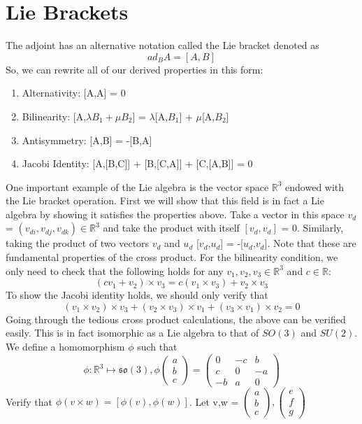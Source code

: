 \documentclass{article}
\begin{document}
\section{Lie Brackets}
The adjoint has an alternative notation called the Lie bracket denoted as
\[ad_{B}A = [A,B]\]
So, we can rewrite all of our derived properties in this form:
\begin{enumerate}
    \item Alternativity: [A,A] = 0
    \item Bilinearity: [A,$\lambda B_{1}+\mu B_{2}$] = $\lambda$[A,$B_{1}$] + $\mu$[A,$B_{2}$]
    \item Antisymmetry: [A,B] = -[B,A]
    \item Jacobi Identity: [A,[B,C]] + [B,[C,A]] + [C,[A,B]] = 0
\end{enumerate}
One important example of the Lie algebra is the vector space $\mathbb{R}^3$ endowed with the Lie bracket operation. First we will show that this field is in fact a Lie algebra by showing it satisfies the properties above.
Take a vector in this space $v_{d}$ = $(v_{di},v_{dj},v_{dk}) \in \mathbb{R}^3$ and take the product with itself $[v_{d},v_{d}]$ = 0. Similarly, taking the product of two vectors $v_{d}$ and $u_{d}$ [$v_{d}$,$u_{d}$] = -[$u_{d}$,$v_{d}$]. Note that these are fundamental properties of the cross product. For the bilinearity condition, we only need to check that the following holds for any $v_{1},v_{2},v_{3} \in \mathbb{R}^3$ and $c \in \mathbb{R}$:
\[
(cv_{1}+v_{2})\times v_{3} = c(v_{1}\times v_{3}) + v_{2}\times v_{3}
\]
To show the Jacobi identity holds, we should only verify that \[(v_{1}\times v_{2})\times v_{3} + 
(v_{2}\times v_{3})\times v_{1} + (v_{3}\times v_{1})\times v_{2} = 0\]
Going through the tedious cross product calculations, the above can be verified easily. This is in fact isomorphic as a Lie algebra to that of $SO(3)$ and $SU(2)$.
We define a homomorphism $\phi$ such that
\[
\phi: \mathbb{R}^3 \mapsto \mathfrak{so}(3), \phi\begin{pmatrix}a\\b\\c\end{pmatrix} = \begin{pmatrix}0&-c&b\\c&0&-a\\-b&a&0\end{pmatrix}
\]
Verify that $\phi(v\times w) = [\phi(v),\phi(w)]$.
Let v,w = $\begin{pmatrix}a\\b\\c\end{pmatrix},\begin{pmatrix}e\\f\\g\end{pmatrix}$
\end{document}
